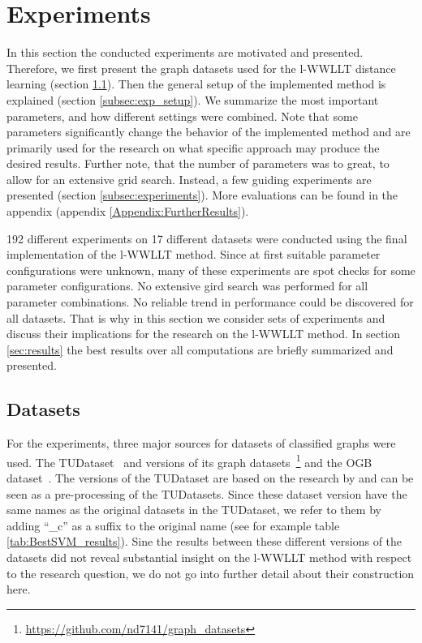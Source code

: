 \section{Experiments} \label{sec:experiments}
	
	In this section the conducted experiments are motivated and presented.
	Therefore, we first present the graph datasets used for the l-WWLLT distance learning (section \ref{subsec:datasets}).
	Then the general setup of the implemented method is explained (section \ref{subsec:exp_setup}).
	We summarize the most important parameters, and how different settings were combined.
	Note that some parameters significantly change the behavior of the implemented method and are primarily used for the research on what specific approach may produce the desired results.
	Further note, that the number of parameters was to great, to allow for an extensive grid search.
	Instead, a few guiding experiments are presented (section \ref{subsec:experiments}).
	More evaluations can be found in the appendix (appendix \ref{Appendix:FurtherResults}).

	192 different experiments on 17 different datasets were conducted using the final implementation of the l-WWLLT method.
	Since at first suitable parameter configurations were unknown, many of these experiments are spot checks for some parameter configurations.
	No extensive gird search was performed for all parameter combinations.
	No reliable trend in performance could be discovered for all datasets.
	That is why in this section we consider sets of experiments and discuss their implications for the research on the l-WWLLT method.
	In section \ref{sec:results} the best results over all computations are briefly summarized and presented.
		
	\subsection{Datasets} \label{subsec:datasets}
		For the experiments, three major sources for datasets of classified graphs were used.
		The TUDataset~\cite{2020_Morris_CONF} and versions of its graph datasets~\cite{2019_Ivanov_CONF}\footnote{\url{https://github.com/nd7141/graph_datasets}}
		and the OGB dataset~\cite{2020_Hu_CONF}.
		The versions of the TUDataset are based on the research by \citeauthor{2019_Ivanov_CONF} and can be seen as a pre-processing of the TUDatasets.
		Since these dataset version have the same names as the original datasets in the TUDataset, we refer to them by adding \enquote{\_c} as a suffix to the original name (see for example table \ref{tab:BestSVM_results}).
		Sine the results between these different versions of the datasets did not reveal substantial insight on the l-WWLLT method with respect to the research question, we do not go into further detail about their construction here.
				

